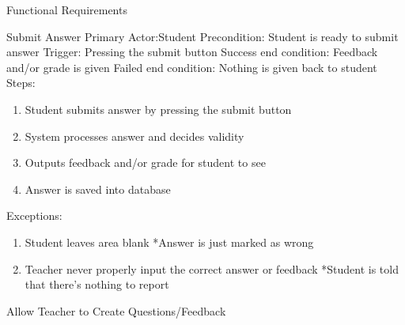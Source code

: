 \documentclass{article}
\begin{document}
\begin{section}{Functional Requirements}
    \begin{subsection}{Submit Answer}
    Primary Actor:Student \newline
    Precondition: Student is ready to submit answer \newline
    Trigger: Pressing the submit button \newline
    Success end condition: Feedback and/or grade is given       \newline
    Failed end condition: Nothing is given back to student      \newline
    \newline
    Steps:
    \begin{enumerate}
    \item{Student submits answer by pressing the submit             button}
    \item{System processes answer and decides validity}
    \item{Outputs feedback and/or grade for student to see}
    \item{Answer is saved into database}
    \end{enumerate}
    Exceptions:
    \begin{enumerate}
    \item{Student leaves area blank \newline
	*Answer is just marked as wrong}
	\addtocounter{enumi}{1}
    \item{Teacher never properly input the correct answer or     feedback \newline
	*Student is told that there's nothing to report}
    \end{enumerate}
    \end{subsection}
    
    \begin{subsection}{Allow Teacher to Create    Questions/Feedback}
    

\end{subsection}
\end{section}
\end{document}
